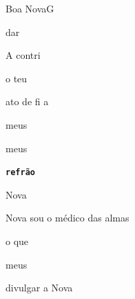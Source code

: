 \documentclass[a4,12pt,oneside]{book}
\begin{document}
\begin{song}{Boa Nova}{G}
\begin{flushleft}
\begin{minipage}{0.50\columnwidth}
\begin{SBVerse}
				  dar
				
				A  contri
				
				 o teu 
				
				 ato de fi a 
				
				 meus 
				
				 meus 


				\texttt{\textbf{refrão}}
				\ifChordBk
					\vspace{-0.5ex}
				\fi
		    \end{SBVerse}
	\ifChordBk
		\end{minipage}
	\end{flushleft}
	\fi
	
	\ifChordBk
	\begin{flushright}
		\begin{minipage}{0.58\columnwidth}
	\fi
			\begin{SBVerse}
				\ifChordBk
				\vspace{-1.2cm}
				\fi
				 Nova 
				
				 Nova sou o médico das almas
		
				   o  que 
				
				 meus 
				
				 divulgar a  Nova  ~ 
		    \end{SBVerse}
	\ifChordBk
		\end{minipage}
	\end{flushright}
	\fi
\end{song}
\end{document}
